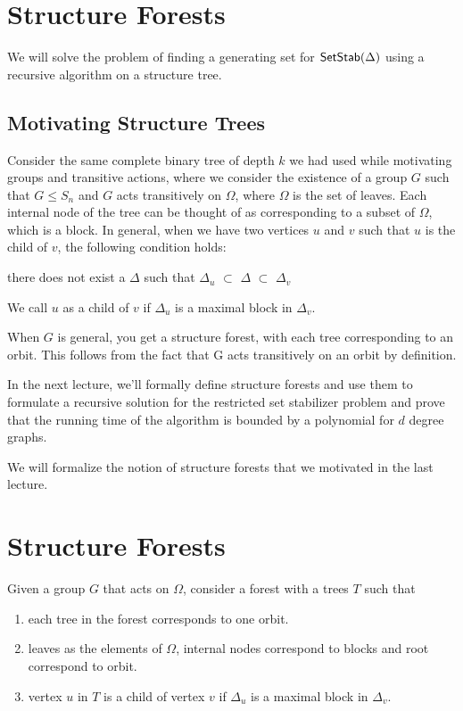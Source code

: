 \section{Structure Forests}

We will solve the problem of finding a generating set for ${\sf SetStab} (\Delta)$
using a recursive algorithm on a structure tree.

\subsection{Motivating Structure Trees}
Consider the same complete binary tree of depth $k$ we had used while
motivating groups and transitive actions, where we consider the existence of a
group $G$ such that $G \leqslant S_{n}$ and $G$ acts transitively on $\Omega$,
where $\Omega$ is the set of leaves. Each internal node of the tree can be
thought of as corresponding to a subset of $\Omega$, which is a block. In
general, when we have two vertices $u$ and $v$ such that $u$ is the child of
$v$, the following condition holds: \begin{center}
there does not exist a $\Delta$ such that $\Delta_{u}$ $\subset$ $\Delta$ $\subset$ $\Delta_{v}$ 
\end{center}
We call $u$ as a child of $v$ if $\Delta_{u}$ is a maximal block in $\Delta_{v}$.
\begin{observation} 
When $G$ is general, you get a structure forest, with each tree corresponding to an orbit. This follows from the fact that G acts transitively on an orbit by definition. 
\end{observation}

In the next lecture, we'll formally define structure forests and use them to formulate a recursive solution for the restricted set stabilizer problem and prove that the running time of the algorithm is bounded by a polynomial for $d$ degree graphs.


We will formalize the notion of structure forests that we motivated in the last lecture.

\section{Structure Forests}
\begin{definition}
Given a group $G$ that acts on $\Omega$, consider a forest 
with a trees $T$  such that 
\begin{enumerate}
\item each tree in the forest corresponds to one orbit.
\item leaves as the elements of $\Omega$, internal nodes correspond to blocks and root correspond to orbit.
\item vertex $u$ in $T$ is a child of vertex $v$ if $\Delta_{u}$ is a maximal block in $\Delta_{v}$.
\end{enumerate}
\end{definition}

